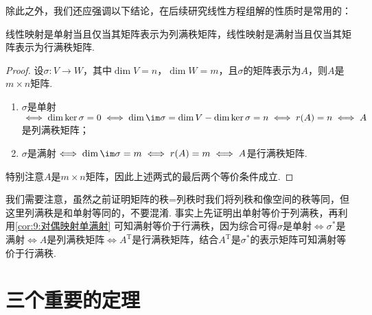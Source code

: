 除此之外，我们还应强调以下结论，在后续研究线性方程组解的性质时是常用的：
\begin{theorem}\label{thm:11:单满射与行列秩}
    线性映射是单射当且仅当其矩阵表示为列满秩矩阵，线性映射是满射当且仅当其矩阵表示为行满秩矩阵.
\end{theorem}

\begin{proof}
    设$\sigma:V\to W$，其中$\dim V=n$，$\dim W=m$，且$\sigma$的矩阵表示为$A$，则$A$是$m\times n$矩阵.
    \begin{enumerate}
        \item $\sigma$是单射$\iff\dim\ker\sigma=0\iff \dim\im\sigma=\dim V-\dim\ker\sigma=n\iff r(A)=n\iff A$是列满秩矩阵；

        \item $\sigma$是满射$\iff\dim\im\sigma=m\iff r(A)=m\iff A$是行满秩矩阵.
    \end{enumerate}
    特别注意$A$是$m\times n$矩阵，因此上述两式的最后两个等价条件成立.
\end{proof}

我们需要注意，虽然之前证明矩阵的秩=列秩时我们将列秩和像空间的秩等同，但这里列满秩是和单射等同的，不要混淆. 事实上先证明出单射等价于列满秩，再利用\autoref{cor:9:对偶映射单满射} 可知满射等价于行满秩，因为综合可得$\sigma$是单射$\iff\sigma^*$是满射$\iff A$是列满秩矩阵$\iff A^\mathrm{T}$是行满秩矩阵，结合$A^\mathrm{T}$是$\sigma^*$的表示矩阵可知满射等价于行满秩.

\section{三个重要的定理}

